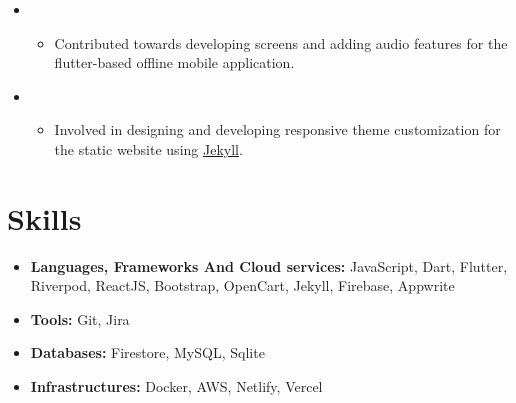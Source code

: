 \documentclass[11pt,a4paper,sans]{moderncv}
\begin{document}
\begin{itemize}
\begin{itemize}
\item{}

\begin{itemize}
    \item Contributed towards developing screens and adding audio features for the flutter-based offline mobile application. 


\end{itemize}

\vspace{6pt}

\item{}

\begin{itemize}
    \item Involved in designing and developing responsive theme customization for the static website using {\href{https://jekyllrb.com/}{\underline {Jekyll}}}.

\end{itemize}

\vspace{6pt}


\end{itemize}


\section{Skills}

\vspace{3pt}

\begin{itemize}

\vspace{6pt}

\item \textbf{Languages, Frameworks And Cloud services:} JavaScript, Dart, Flutter, Riverpod, ReactJS, Bootstrap, OpenCart, Jekyll, Firebase, Appwrite
\vspace{3pt}


\item \textbf{Tools:} Git, Jira
\vspace{3pt}
\item {\textbf{Databases:}} Firestore, MySQL, Sqlite
\vspace{3pt}
\item \textbf{Infrastructures:} Docker, AWS, Netlify, Vercel
\vspace{3pt}
\vspace{6pt}


\end{itemize}
\end{itemize}
\end{document}
